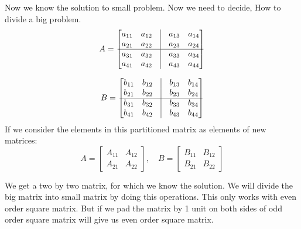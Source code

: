 \documentclass[11pt, a4paper]{article}
\begin{document}
Now we know the solution to small problem.
Now we need to decide, How to divide a big problem.
\[A = \left[\begin{matrix}
    a_{11} & a_{12} & \vline & a_{13} & a_{14} \\
    a_{21} & a_{22} & \vline & a_{23} & a_{24} \\
    \hline
    a_{31} & a_{32} & \vline & a_{33} & a_{34} \\
    a_{41} & a_{42} & \vline & a_{43} & a_{44} \\
\end{matrix}\right]\]

\[B = \left[\begin{matrix}
    b_{11} & b_{12} & \vline & b_{13} & b_{14} \\
    b_{21} & b_{22} & \vline & b_{23} & b_{24} \\
    \hline
    b_{31} & b_{32} & \vline & b_{33} & b_{34} \\
    b_{41} & b_{42} & \vline & b_{43} & b_{44} \\
\end{matrix}\right]\]
If we consider the elements in this partitioned matrix as elements of new matrices:
\[A = \begin{bmatrix}
    A_{11} & A_{12} \\
    A_{21} & A_{22}
\end{bmatrix}, \quad
B = \begin{bmatrix}
    B_{11} & B_{12} \\
    B_{21} & B_{22}
\end{bmatrix}\]

We get a two by two matrix, for which we know the solution. We will divide the big matrix into small matrix by doing this operations. This only works with even order square matrix. But if we pad the matrix by 1 unit on both sides of odd order square matrix will give us even order square matrix. 
\end{document}
